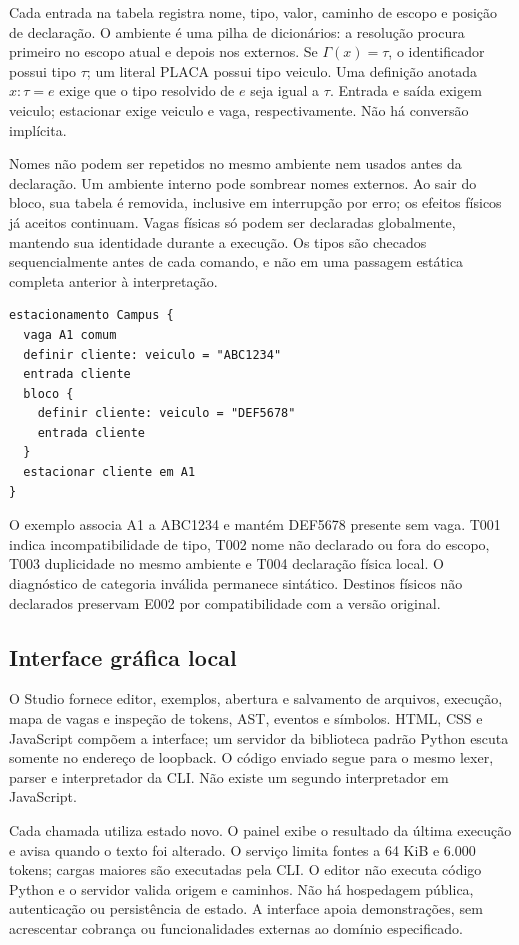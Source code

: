 \documentclass[conference,a4paper]{IEEEtran}
\begin{document}
Cada entrada na tabela registra nome, tipo, valor, caminho de escopo e posição de declaração. O ambiente é uma pilha de dicionários: a resolução procura primeiro no escopo atual e depois nos externos. Se $\Gamma(x)=\tau$, o identificador possui tipo $\tau$; um literal PLACA possui tipo veiculo. Uma definição anotada $x:\tau=e$ exige que o tipo resolvido de $e$ seja igual a $\tau$. Entrada e saída exigem veiculo; estacionar exige veiculo e vaga, respectivamente. Não há conversão implícita.

Nomes não podem ser repetidos no mesmo ambiente nem usados antes da declaração. Um ambiente interno pode sombrear nomes externos. Ao sair do bloco, sua tabela é removida, inclusive em interrupção por erro; os efeitos físicos já aceitos continuam. Vagas físicas só podem ser declaradas globalmente, mantendo sua identidade durante a execução. Os tipos são checados sequencialmente antes de cada comando, e não em uma passagem estática completa anterior à interpretação.

\begin{lstlisting}[caption={Alias global e sombreamento local.}]
estacionamento Campus {
  vaga A1 comum
  definir cliente: veiculo = "ABC1234"
  entrada cliente
  bloco {
    definir cliente: veiculo = "DEF5678"
    entrada cliente
  }
  estacionar cliente em A1
}
\end{lstlisting}
O exemplo associa A1 a ABC1234 e mantém DEF5678 presente sem vaga. T001 indica incompatibilidade de tipo, T002 nome não declarado ou fora do escopo, T003 duplicidade no mesmo ambiente e T004 declaração física local. O diagnóstico de categoria inválida permanece sintático. Destinos físicos não declarados preservam E002 por compatibilidade com a versão original.

\subsection{Interface gráfica local}
O Studio fornece editor, exemplos, abertura e salvamento de arquivos, execução, mapa de vagas e inspeção de tokens, AST, eventos e símbolos. HTML, CSS e JavaScript compõem a interface; um servidor da biblioteca padrão Python escuta somente no endereço de loopback. O código enviado segue para o mesmo lexer, parser e interpretador da CLI. Não existe um segundo interpretador em JavaScript.

Cada chamada utiliza estado novo. O painel exibe o resultado da última execução e avisa quando o texto foi alterado. O serviço limita fontes a 64 KiB e 6.000 tokens; cargas maiores são executadas pela CLI. O editor não executa código Python e o servidor valida origem e caminhos. Não há hospedagem pública, autenticação ou persistência de estado. A interface apoia demonstrações, sem acrescentar cobrança ou funcionalidades externas ao domínio especificado.
\end{document}
